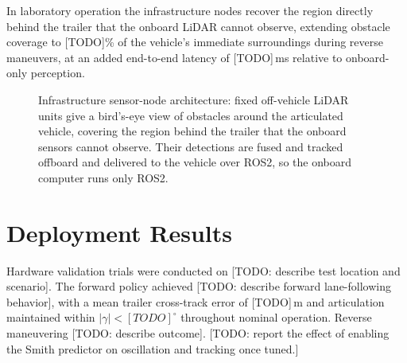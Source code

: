 In laboratory operation the infrastructure nodes recover the region directly behind the trailer that the onboard LiDAR cannot observe, extending obstacle coverage to [TODO]\% of the vehicle's immediate surroundings during reverse maneuvers, at an added end-to-end latency of [TODO]\,ms relative to onboard-only perception.


\begin{figure}[H]
    \centering
    \resizebox{0.85\textwidth}{!}{}
    \caption{Infrastructure sensor-node architecture: fixed off-vehicle LiDAR units give a bird's-eye view of obstacles around the articulated vehicle, covering the region behind the trailer that the onboard sensors cannot observe. Their detections are fused and tracked offboard and delivered to the vehicle over ROS2, so the onboard computer runs only ROS2.}
    \label{fig:sensor_nodes}
\end{figure}

\section{Deployment Results}


Hardware validation trials were conducted on [TODO: describe test location and scenario]. The forward policy achieved [TODO: describe forward lane-following behavior], with a mean trailer cross-track error of [TODO]\,m and articulation maintained within $|\gamma| < [TODO]^\circ$ throughout nominal operation. Reverse maneuvering [TODO: describe outcome]. [TODO: report the effect of enabling the Smith predictor on oscillation and tracking once tuned.]

